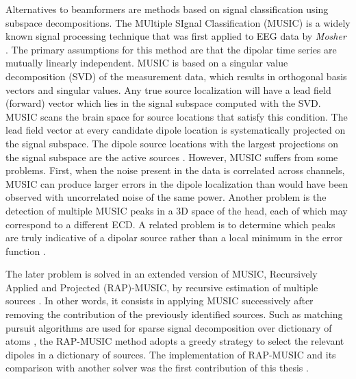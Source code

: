 Alternatives to beamformers are methods based on signal classification using subspace decompositions. The MUltiple SIgnal Classification (MUSIC) is a widely known signal processing technique that was first applied to EEG data by \textit{Mosher} \cite{mosher1992multiple}. The primary assumptions for this method are that the dipolar time series are mutually linearly independent. 
MUSIC is based on a singular value decomposition (SVD) of the measurement data, which results in orthogonal basis vectors and singular values. Any true source localization will have a lead field (forward) vector which lies in the signal subspace computed with the SVD. MUSIC scans the brain space for source locations that satisfy this condition. The lead field vector at every candidate dipole location is systematically projected on the signal subspace. The dipole source locations with the largest projections on the signal subspace are the active sources \cite{mosher1992multiple,mosher1999source}. However, MUSIC suffers from some problems. First, when the noise present in the data is correlated across channels, MUSIC can produce larger errors in the dipole localization than would have been observed with uncorrelated noise of the same power. Another problem is the detection of multiple MUSIC peaks in a 3D space of the head, each of which may correspond to a different ECD. A related problem is to determine which peaks are truly indicative of a dipolar source rather than a local minimum in the error function \cite{mosher1999source}.

The later problem is solved in an extended version of MUSIC, Recursively Applied and Projected (RAP)-MUSIC, by recursive estimation of multiple sources \cite{mosher1997source,mosher1999source}. In other words, it consists in applying MUSIC successively after removing the contribution of the previously identified sources. Such as matching pursuit algorithms are used for sparse signal decomposition over dictionary of atoms \cite{mallat1993matching}, the RAP-MUSIC method adopts a greedy strategy to select the relevant dipoles in a dictionary of sources. The implementation of RAP-MUSIC and its comparison with another solver was the first contribution of this thesis \cite{irMxNE}.

